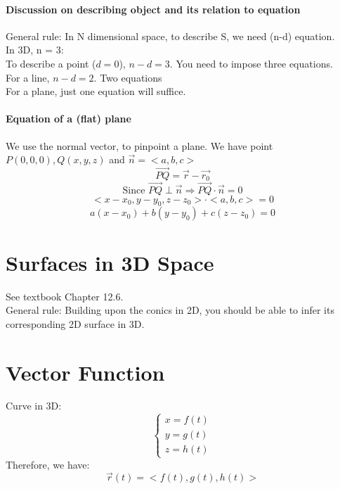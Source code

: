 \documentclass[11pt, oneside]{article}   	%
\begin{document}
\paragraph{Discussion on describing object and its relation to equation}
General rule: In N dimensional space, to describe S, we need (n-d) equation. \\
In 3D, n = 3: \\
\indent To describe a point ($d = 0$),  $n - d =3$. You need to impose three equations. \\
\indent For a line, $ n -d = 2$. Two equations\\
\indent For a plane, just one equation will suffice.

\paragraph{Equation of a (flat) plane}
We use the normal vector, to pinpoint a plane. We have point $P(0, 0, 0), Q(x, y, z)$ and $\vec{n} = <a,b,c>$
$$\vec{PQ} = \vec{r} - \vec{r_0}$$ $$\text{Since } \vec{PQ} \perp \vec{n} \Rightarrow \vec{PQ} \cdot \vec{n} = 0 $$ 
$$<x -x_0, y-y_0, z-z_0> \cdot <a,b,c> = 0$$
$$a(x-x_0) + b(y-y_0) + c(z-z_0) = 0$$

\section{Surfaces in 3D Space}
See textbook Chapter 12.6. \\
General rule: Building upon the conics in 2D, you should be able to infer its corresponding 2D surface in 3D. 

\section{Vector Function}
Curve in 3D: 
\begin{equation}
  \begin{cases}
    x = f(t)\\
    y = g(t)\\
    z=  h(t)
  \end{cases}
\end{equation}
Therefore, we have: $$\vec{r}(t)=<f(t), g(t), h(t)>$$
\end{document}
